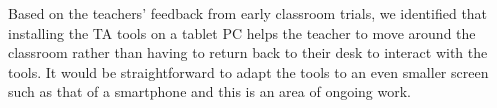 
Based on the teachers' feedback from early classroom trials, we
identified that installing the TA tools on a tablet PC 
helps the teacher to move around the classroom rather than
having to return back to their desk to interact with the tools.
It would be straightforward to adapt the tools to an even smaller screen such
as that of a smartphone and this is an area of ongoing work.

